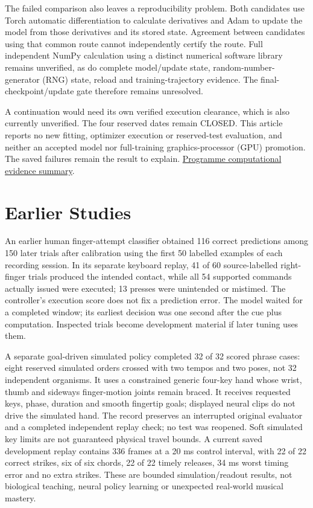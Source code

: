 The failed comparison also leaves a reproducibility problem. Both candidates use Torch automatic differentiation to calculate derivatives and Adam to update the model from those derivatives and its stored state. Agreement between candidates using that common route cannot independently certify the route. Full independent NumPy calculation using a distinct numerical software library remains unverified, as do complete model/update state, random-number-generator (RNG) state, reload and training-trajectory evidence. The final-checkpoint/update gate therefore remains unresolved.\par

A continuation would need its own verified execution clearance, which is also currently unverified. The four reserved dates remain CLOSED. This article reports no new fitting, optimizer execution or reserved-test evaluation, and neither an accepted model nor full-training graphics-processor (GPU) promotion. The saved failures remain the result to explain. \href{research-evidence.json}{Programme computational evidence summary}.\par

\section{Earlier Studies}

An earlier human finger-attempt classifier obtained 116 correct predictions among 150 later trials after calibration using the first 50 labelled examples of each recording session. In its separate keyboard replay, 41 of 60 source-labelled right-finger trials produced the intended contact, while all 54 supported commands actually issued were executed; 13 presses were unintended or mistimed. The controller's execution score does not fix a prediction error. The model waited for a completed window; its earliest decision was one second after the cue plus computation. Inspected trials become development material if later tuning uses them.\par

A separate goal-driven simulated policy completed 32 of 32 scored phrase cases: eight reserved simulated orders crossed with two tempos and two poses, not 32 independent organisms. It uses a constrained generic four-key hand whose wrist, thumb and sideways finger-motion joints remain braced. It receives requested keys, phase, duration and smooth fingertip goals; displayed neural clips do not drive the simulated hand. The record preserves an interrupted original evaluator and a completed independent replay check; no test was reopened. Soft simulated key limits are not guaranteed physical travel bounds. A current saved development replay contains 336 frames at a 20 ms control interval, with 22 of 22 correct strikes, six of six chords, 22 of 22 timely releases, 34 ms worst timing error and no extra strikes. These are bounded simulation/readout results, not biological teaching, neural policy learning or unexpected real-world musical mastery.\par

